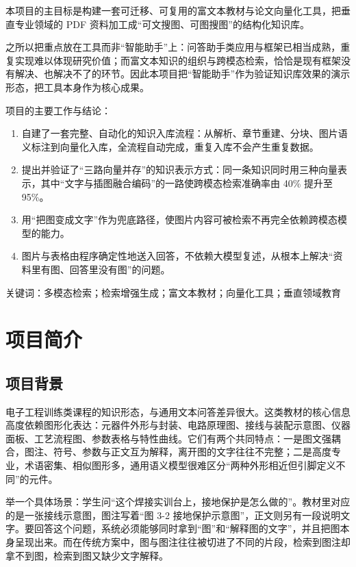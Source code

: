 \documentclass[12pt,a4paper]{ctexart}
\begin{document}
本项目的主目标是构建一套可迁移、可复用的富文本教材与论文向量化工具，把垂直专业领域的 PDF 资料加工成“可文搜图、可图搜图”的结构化知识库。

之所以把重点放在工具而非“智能助手”上：问答助手类应用与框架已相当成熟，重复实现难以体现研究价值；而富文本知识的组织与跨模态检索，恰恰是现有框架没有解决、也解决不了的环节。因此本项目把“智能助手”作为验证知识库效果的演示形态，把工具本身作为核心成果。

项目的主要工作与结论：

\begin{enumerate}[leftmargin=2.6em,itemsep=3pt]
  \item 自建了一套完整、自动化的知识入库流程：从解析、章节重建、分块、图片语义标注到向量化入库，全流程自动完成，重复入库不会产生重复数据。
  \item 提出并验证了“三路向量并存”的知识表示方式：同一条知识同时用三种向量表示，其中“文字与插图融合编码”的一路使跨模态检索准确率由 40\% 提升至 95\%。
  \item 用“把图变成文字”作为兜底路径，使图片内容可被检索不再完全依赖跨模态模型的能力。
  \item 图片与表格由程序确定性地送入回答，不依赖大模型复述，从根本上解决“资料里有图、回答里没有图”的问题。
\end{enumerate}

\vspace{4pt}
\noindent 关键词：多模态检索；检索增强生成；富文本教材；向量化工具；垂直领域教育

\section{项目简介}

\subsection{项目背景}

电子工程训练类课程的知识形态，与通用文本问答差异很大。这类教材的核心信息高度依赖图形化表达：元器件外形与封装、电路原理图、接线与装配示意图、仪器面板、工艺流程图、参数表格与特性曲线。它们有两个共同特点：一是图文强耦合，图注、符号、参数与正文互为解释，离开图的文字往往不完整；二是高度专业，术语密集、相似图形多，通用语义模型很难区分“两种外形相近但引脚定义不同”的元件。

举一个具体场景：学生问“这个焊接实训台上，接地保护是怎么做的”。教材里对应的是一张接线示意图，图注写着“图 3-2 接地保护示意图”，正文则另有一段说明文字。要回答这个问题，系统必须能够同时拿到“图”和“解释图的文字”，并且把图本身呈现出来。而在传统方案中，图与图注往往被切进了不同的片段，检索到图注却拿不到图，检索到图又缺少文字解释。
\end{document}
